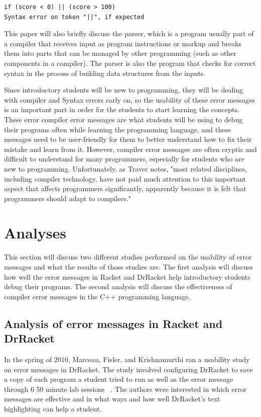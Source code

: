 \documentclass{sig-alternate}
\begin{document}
\begin{verbatim}
if (score < 0) || (score > 100) 
Syntax error on token "||", if expected
\end{verbatim}

This paper will also briefly discuss the parser, which is a program usually part of a compiler that receives input as program instructions or markup and breaks them into parts that can be managed by other programming (such as other components in a compiler). The parser is also the program that checks for correct syntax in the process of building data structures from the inputs. 

Since introductory students will be new to programming, they will be dealing with compiler and Syntax errors early on, so the usability of these error messages is an important part in order for the students to start learning the concepts. These error compiler error messages are what students will be using to debug their programs often while learning the programming language, and these messages need to be user-friendly for them to better understand how to fix their mistake and learn from it. However, compiler error messages are often cryptic and difficult to understand for many programmers, especially for students who are new to programming. Unfortunately, as Traver notes, "most related disciplines, including compiler technology, have not paid much attention to this important aspect that affects programmers significantly, apparently because it is felt that programmers should adapt to compilers." ~\cite{Traver:2010}



\section{Analyses}\label{analyses}
This section will discuss two different studies performed on the usability of error messages and what the results of those studies are. The first analysis will discuss how well the error messages in Racket and DrRacket help introductory students debug their programs. The second analysis will discuss the effectiveness of compiler error messages in the C++ programming language. 


\subsection{Analysis of error messages in Racket and DrRacket}
In the spring of 2010, Marceau, Fisler, and Krishnamurthi ran a usability study on error messages in DrRacket. The study involved configuring DrRacket to save a copy of each program a student tried to run as well as the error message through 6 50 minute lab sessions ~\cite{Marceau:2011:MEE:1953163.1953308}. The authors were interested in which error messages are effective and in what ways and how well DrRacket's text highlighting can help a student.  
\end{document}
